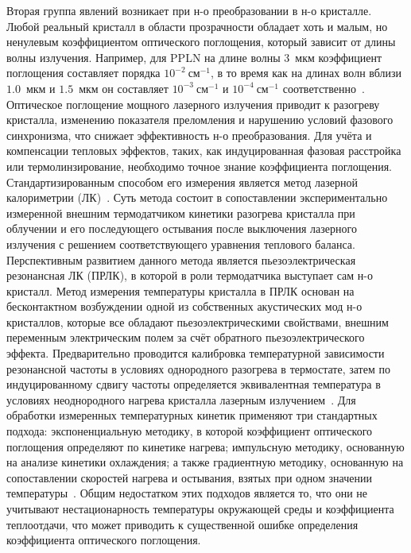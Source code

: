 Вторая группа явлений возникает при н-о преобразовании в н-о кристалле. Любой реальный кристалл в области прозрачности обладает хоть и малым, но ненулевым коэффициентом оптического поглощения, который зависит от длины волны излучения. Например, для PPLN на длине волны 3~мкм коэффициент поглощения составляет порядка $10^{-2}~\text{см}^{-1}$, в то время как на длинах волн вблизи $1.0$~мкм и $1.5$~мкм он составляет $10^{-3}~\text{см}^{-1}$ и $10^{-4}~\text{см}^{-1}$ соответственно~\cite{leidinger2015comparative}. Оптическое поглощение мощного лазерного излучения приводит к разогреву кристалла, изменению показателя преломления и нарушению условий фазового синхронизма, что снижает эффективность н-о преобразования. Для учёта и компенсации тепловых эффектов, таких, как индуцированная фазовая расстройка или термолинзирование, необходимо точное знание коэффициента поглощения. Стандартизированным способом его измерения является метод лазерной калориметрии (ЛК)~\cite{iso}. Суть метода состоит в сопоставлении экспериментально измеренной внешним термодатчиком кинетики разогрева кристалла при облучении и его последующего остывания после выключения лазерного излучения с решением соответствующего уравнения теплового баланса. Перспективным развитием данного метода является пьезоэлектрическая резонансная ЛК (ПРЛК), в которой в роли термодатчика выступает сам н-о кристалл. Метод измерения температуры кристалла в ПРЛК основан на бесконтактном возбуждении одной из собственных акустических мод н-о кристаллов, которые все обладают пьезоэлектрическими свойствами, внешним переменным электрическим полем за счёт обратного пьезоэлектрического эффекта. Предварительно проводится калибровка температурной зависимости резонансной частоты в условиях однородного разогрева в термостате, затем по индуцированному сдвигу частоты определяется эквивалентная температура в условиях неоднородного нагрева кристалла лазерным излучением~\cite{aloyan2022acoustic}. Для обработки измеренных температурных кинетик применяют три стандартных подхода: экспоненциальную методику, в которой коэффициент оптического поглощения определяют по кинетике нагрева; импульсную методику, основанную на анализе кинетики охлаждения; а также градиентную методику, основанную на сопоставлении скоростей нагрева и остывания, взятых при одном значении температуры~\cite{iso_old}. Общим недостатком этих подходов является то, что они не учитывают нестационарность температуры окружающей среды и коэффициента теплоотдачи, что может приводить к существенной ошибке определения коэффициента оптического поглощения.

